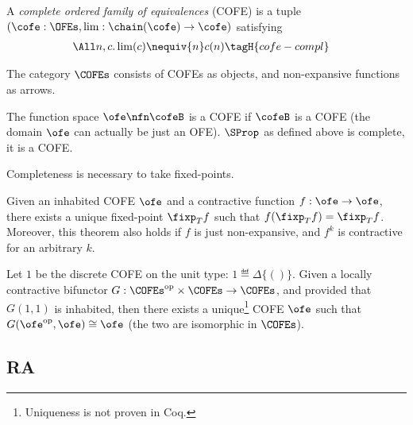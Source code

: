 \begin{defn}
  A \emph{complete ordered family of equivalences} (COFE) is a tuple $(\cofe : \OFEs,  \lim : \chain(\cofe) \to \cofe)$ satisfying
  \begin{align*}
    \All n, c.& \lim(c) \nequiv{n} c(n) \tagH{cofe-compl}
  \end{align*}
\end{defn}

\begin{defn}
  The category $\COFEs$ consists of COFEs as objects, and non-expansive functions as arrows.
\end{defn}

The function space $\ofe \nfn \cofeB$ is a COFE if $\cofeB$ is a COFE (\ie the domain $\ofe$ can actually be just an OFE).
$\SProp$ as defined above is complete, \ie it is a COFE.

Completeness is necessary to take fixed-points.

\begin{thm}
\label{thm:banach}
Given an inhabited COFE $\ofe$ and a contractive function $f : \ofe \to \ofe$, there exists a unique fixed-point $\fixp_T f$ such that $f(\fixp_T f) = \fixp_T f$.
Moreover, this theorem also holds if $f$ is just non-expansive, and $f^k$ is contractive for an arbitrary $k$.
\end{thm}

\begin{thm}
\label{thm:america_rutten}
Let $1$ be the discrete COFE on the unit type: $1 \eqdef \Delta \{ () \}$.
Given a locally contractive bifunctor $G : \COFEs^{\textrm{op}} \times \COFEs \to \COFEs$, and provided that \(G(1, 1)\) is inhabited,
then there exists a unique\footnote{Uniqueness is not proven in Coq.} COFE $\ofe$ such that $G(\ofe^{\textrm{op}}, \ofe) \cong \ofe$ (\ie the two are isomorphic in $\COFEs$).
\end{thm}

\subsection{RA}

